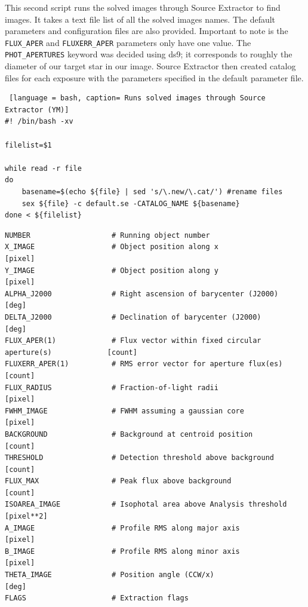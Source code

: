 \documentclass{aastex61}
\begin{document}
This second script runs the solved images through Source Extractor to find images. It takes a text file list of all the solved images names. The default parameters and configuration files are also provided. Important to note is the \verb|FLUX_APER| and \verb|FLUXERR_APER| parameters only have one value. The \verb|PHOT_APERTURES| keyword was decided using ds9; it corresponds to roughly the diameter of our target star in our image. Source Extractor then created catalog files for each exposure with the parameters specified in the default parameter file.
\begin{lstlisting} [language = bash, caption= Runs solved images through Source Extractor (YM)]
#! /bin/bash -xv

filelist=$1

while read -r file
do
	basename=$(echo ${file} | sed 's/\.new/\.cat/') #rename files
	sex ${file} -c default.se -CATALOG_NAME ${basename}
done < ${filelist}
\end{lstlisting}

\begin{lstlisting}[caption = Default parameters for Source Extractor (YM)]
NUMBER                   # Running object number  
X_IMAGE                  # Object position along x                                   [pixel]
Y_IMAGE                  # Object position along y                                   [pixel]
ALPHA_J2000              # Right ascension of barycenter (J2000)                     [deg]
DELTA_J2000              # Declination of barycenter (J2000)                         [deg]
FLUX_APER(1)             # Flux vector within fixed circular aperture(s)             [count]
FLUXERR_APER(1)          # RMS error vector for aperture flux(es)                    [count]
FLUX_RADIUS              # Fraction-of-light radii                                   [pixel]
FWHM_IMAGE               # FWHM assuming a gaussian core                             [pixel]
BACKGROUND               # Background at centroid position                           [count]
THRESHOLD                # Detection threshold above background                      [count]
FLUX_MAX                 # Peak flux above background                                [count]
ISOAREA_IMAGE            # Isophotal area above Analysis threshold                   [pixel**2]
A_IMAGE                  # Profile RMS along major axis                              [pixel]
B_IMAGE                  # Profile RMS along minor axis                              [pixel]
THETA_IMAGE              # Position angle (CCW/x)                                    [deg]
FLAGS                    # Extraction flags                                         
\end{lstlisting}
\end{document}
